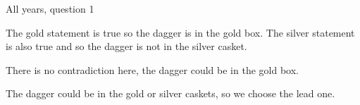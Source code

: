 \begin{MyInnerBox}{All years, question 1}
{\begin{MySolutionBox}
        \hspace{1em} The gold statement is true so the dagger is in the gold box. The silver statement is also true and so the dagger is not in the silver casket.\par
        There is no contradiction here, the dagger could be in the gold box.\par\medskip
        The dagger could be in the gold or silver caskets, so we choose the lead one.\par\medskip
      \end{MySolutionBox}
    }{}%
    \end{MyInnerBox}

